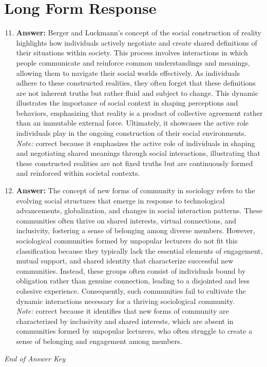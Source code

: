 \documentclass[12pt]{article}
\begin{document}
\section*{Long Form Response}
\begin{enumerate}[label=\arabic*.]
\setcounter{enumi}{10}
\item \textbf{Answer:} Berger and Luckmann's concept of the social construction of reality highlights how individuals actively negotiate and create shared definitions of their situations within society. This process involves interactions in which people communicate and reinforce common understandings and meanings, allowing them to navigate their social worlds effectively. As individuals adhere to these constructed realities, they often forget that these definitions are not inherent truths but rather fluid and subject to change. This dynamic illustrates the importance of social context in shaping perceptions and behaviors, emphasizing that reality is a product of collective agreement rather than an immutable external force. Ultimately, it showcases the active role individuals play in the ongoing construction of their social environments.
\\ \textit{Note:} correct because it emphasizes the active role of individuals in shaping and negotiating shared meanings through social interactions, illustrating that these constructed realities are not fixed truths but are continuously formed and reinforced within societal contexts.
\item \textbf{Answer:} The concept of new forms of community in sociology refers to the evolving social structures that emerge in response to technological advancements, globalization, and changes in social interaction patterns. These communities often thrive on shared interests, virtual connections, and inclusivity, fostering a sense of belonging among diverse members. However, sociological communities formed by unpopular lecturers do not fit this classification because they typically lack the essential elements of engagement, mutual support, and shared identity that characterize successful new communities. Instead, these groups often consist of individuals bound by obligation rather than genuine connection, leading to a disjointed and less cohesive experience. Consequently, such communities fail to cultivate the dynamic interactions necessary for a thriving sociological community.
\\ \textit{Note:} correct because it identifies that new forms of community are characterized by inclusivity and shared interests, which are absent in communities formed by unpopular lecturers, who often struggle to create a sense of belonging and engagement among members.
\end{enumerate}

\vfill
\noindent\textit{End of Answer Key}
\end{document}
